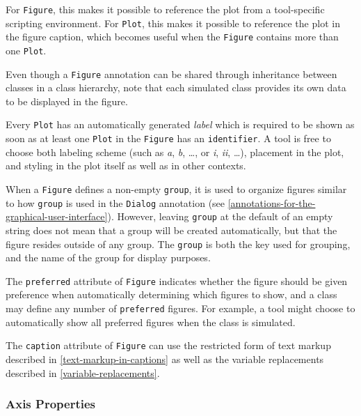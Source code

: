 \begin{nonnormative}
For \lstinline!Figure!, this makes it possible to reference the plot from a tool-specific scripting environment.
For \lstinline!Plot!, this makes it possible to reference the plot in the figure caption, which becomes useful when the \lstinline!Figure! contains more than one \lstinline!Plot!.
\end{nonnormative}

Even though a \lstinline!Figure! annotation can be shared through inheritance between classes in a class hierarchy, note that each simulated class provides its own data to be displayed in the figure.

Every \lstinline!Plot! has an automatically generated \emph{label} which is required to be shown as soon as at least one \lstinline!Plot! in the \lstinline!Figure! has an \lstinline!identifier!.
A tool is free to choose both labeling scheme (such as \emph{a}, \emph{b}, \dots, or \emph{i}, \emph{ii}, \dots), placement in the plot, and styling in the plot itself as well as in other contexts.

When a \lstinline!Figure! defines a non-empty \lstinline!group!, it is used to organize figures similar to how \lstinline!group! is used in the \lstinline!Dialog! annotation (see \cref{annotations-for-the-graphical-user-interface}).
However, leaving \lstinline!group! at the default of an empty string does not mean that a group will be created automatically, but that the figure resides outside of any group.
The \lstinline!group! is both the key used for grouping, and the name of the group for display purposes.

The \lstinline!preferred! attribute of \lstinline!Figure! indicates whether the figure should be given preference when automatically determining which figures to show, and a class may define any number of \lstinline!preferred! figures.
For example, a tool might choose to automatically show all preferred figures when the class is simulated.

The \lstinline!caption! attribute of \lstinline!Figure! can use the restricted form of text markup described in \cref{text-markup-in-captions} as well as the variable replacements described in \cref{variable-replacements}.

\subsubsection{Axis Properties}\label{axis-properties}

